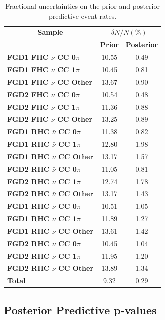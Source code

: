 \begin{center}
\begin{table}
\center
\begin{tabular}{l||c c}
\hline \hline
\multicolumn{1}{c||}{\textbf{Sample}} & \multicolumn{2}{c}{$\delta N/N(\%)$}\\
& \multicolumn{1}{c}{\textbf{Prior}} & \multicolumn{1}{c}{\textbf{Posterior}} \\
\hline\hline
\textbf{FGD1 FHC $\nu$ CC 0$\pi$} & 10.55 & 0.49\\
\textbf{FGD1 FHC $\nu$ CC 1$\pi$} & 10.45 & 0.81\\ 
\textbf{FGD1 FHC $\nu$ CC Other} & 13.67 & 0.90\\ \hline
\textbf{FGD2 FHC $\nu$ CC 0$\pi$} & 10.54 & 0.48\\
\textbf{FGD2 FHC $\nu$ CC 1$\pi$} & 11.36 & 0.88\\
\textbf{FGD2 FHC $\nu$ CC Other} & 13.25 & 0.89\\ \hline
\textbf{FGD1 RHC $\bar{\nu}$ CC 0$\pi$} & 11.38 & 0.82\\
\textbf{FGD1 RHC $\bar{\nu}$ CC 1$\pi$} & 12.80 & 1.98\\
\textbf{FGD1 RHC $\bar{\nu}$ CC Other} & 13.17 & 1.57\\ \hline
\textbf{FGD2 RHC $\bar{\nu}$ CC 0$\pi$} & 11.05 & 0.81\\
\textbf{FGD2 RHC $\bar{\nu}$ CC 1$\pi$} & 12.74 & 1.78\\
\textbf{FGD2 RHC $\bar{\nu}$ CC Other} & 13.17 & 1.43\\ \hline
\textbf{FGD1 RHC $\nu$ CC 0$\pi$} & 10.51 & 1.05\\
\textbf{FGD1 RHC $\nu$ CC 1$\pi$} & 11.89 & 1.27\\
\textbf{FGD1 RHC $\nu$ CC Other} & 13.61 & 1.42\\ \hline
\textbf{FGD2 RHC $\nu$ CC 0$\pi$} & 10.45 & 1.04\\
\textbf{FGD2 RHC $\nu$ CC 1$\pi$} & 11.95 & 1.20\\ 
\textbf{FGD2 RHC $\nu$ CC Other} & 13.89 & 1.34\\ \hline
\textbf{Total} & 9.32 & 0.29 \\ \hline\hline
\end{tabular}
\caption{Fractional uncertainties on the prior and posterior predictive event rates.}
\label{tab:prederr}
\end{table}
\end{center}

\subsection{Posterior Predictive p-values}

